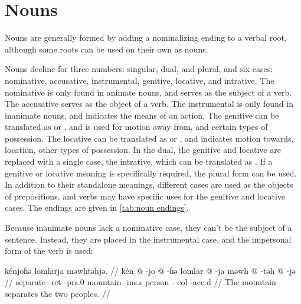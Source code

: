 \section{Nouns}

Nouns are generally formed by adding a nominalizing ending to a verbal root,
although some roots can be used on their own as nouns.

Nouns decline for three numbers: singular, dual, and plural, and six cases:
nominative, accusative, instrumental, genitive, locative, and intrative. The
nominative is only found in animate nouns, and serves as the subject of a verb.
The accusative serves as the object of a verb. The instrumental is only found
in inanimate nouns, and indicates the means of an action. The genitive can be
translated as  or , and is used for motion away from, and
certain types of possession. The locative can be translated as  or
, and indicates motion towards, location, other types of possession. In
the dual, the genitive and locative are replaced with a single case, the
intrative, which can be translated as . If a genitive or locative
meaning is specifically required, the plural form can be used. In addition to
their standalone meanings, different cases are used as the objects of
prepositions, and verbs may have specific uses for the genitive and locative
cases. The endings are given in \cref{tab:noun endings}.

Because inanimate nouns lack a nominative case, they can't be the subject of a
sentence. Instead, they are placed in the instrumental case, and the impersonal
form of the verb is used:

\ex
\begingl
    \glpreamble kénjoɦə lomlarja məwhtəhjə. //
    \gla kén @ -jo @ -ɦə lomlar @ -ja məwh @ -təh @ -jə //
    \glb separate -{\sc ret} -{\sc prs}.0 mountain -{\sc ins}.s person -{\sc
        col} -{\sc acc}.d //
    \glft The mountain separates the two peoples. //
\endgl
\xe

